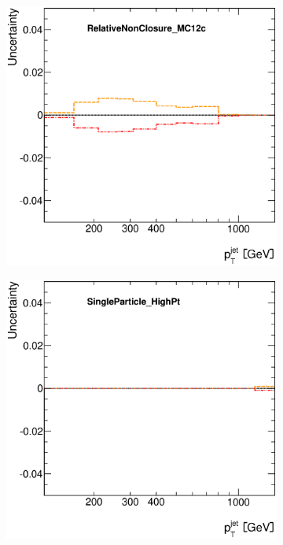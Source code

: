 \documentclass[12pt, twoside]{article}
\numberwithin{equation}{section}
\numberwithin{figure}{section}
\newenvironment{changemargin}[2]{%
\begin{list}{}{%
\setlength{\topsep}{0pt}%
\setlength{\leftmargin}{#1}%
\setlength{\rightmargin}{#2}%
\setlength{\listparindent}{\parindent}%
\setlength{\itemindent}{\parindent}%
\setlength{\parsep}{\parskip}%
}%
\item[]}{\end{list}}
\begin{document}
\begin{figure}[H]
\begin{changemargin}{-1.0cm}{-0.75cm}
\begin{changemargin}{-0.75cm}{-1.0cm}
\begin{subfigure}[b]{0.25\textwidth}
            \includegraphics[width=\textwidth]{./images/JetSystematics/JetSystematic-42.eps}
        \end{subfigure}
        \begin{subfigure}[b]{0.25\textwidth}
            \includegraphics[width=\textwidth]{./images/JetSystematics/JetSystematic-43.eps}

\end{subfigure}
\end{changemargin}
\end{changemargin}
\end{figure}
\end{document}
